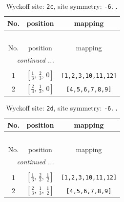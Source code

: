 \documentclass[fleqn,8pt]{jsarticle}
\begin{document}
\begin{longtable}{ccc}
\caption{Wyckoff site: {\tt 2c}, site symmetry: {\tt -6..}}
 \\
 \hline \hline
No. & position & mapping \\ \hline \endfirsthead

\multicolumn{2}{l}{\tablename\ \thetable{}} \\
 \hline \hline
No. & position & mapping \\ \hline \endhead

 \hline \hline
\multicolumn{2}{r}{\footnotesize\it continued ...} \\ \endfoot

 \hline \hline
\multicolumn{2}{r}{} \\ \endlastfoot

1 & $\left[ \frac{1}{3},\, \frac{2}{3},\, 0 \right]$ & {\tt [1,2,3,10,11,12]} \\ \hline
2 & $\left[ \frac{2}{3},\, \frac{1}{3},\, 0 \right]$ & {\tt [4,5,6,7,8,9]} \\
\end{longtable}
\renewcommand{\arraystretch}{1.2}
\begin{longtable}{ccc}
\caption{Wyckoff site: {\tt 2d}, site symmetry: {\tt -6..}}
 \\
 \hline \hline
No. & position & mapping \\ \hline \endfirsthead

\multicolumn{2}{l}{\tablename\ \thetable{}} \\
 \hline \hline
No. & position & mapping \\ \hline \endhead

 \hline \hline
\multicolumn{2}{r}{\footnotesize\it continued ...} \\ \endfoot

 \hline \hline
\multicolumn{2}{r}{} \\ \endlastfoot

1 & $\left[ \frac{1}{3},\, \frac{2}{3},\, \frac{1}{2} \right]$ & {\tt [1,2,3,10,11,12]} \\ \hline
2 & $\left[ \frac{2}{3},\, \frac{1}{3},\, \frac{1}{2} \right]$ & {\tt [4,5,6,7,8,9]} \\
\end{longtable}
\renewcommand{\arraystretch}{1.2}
\end{document}
